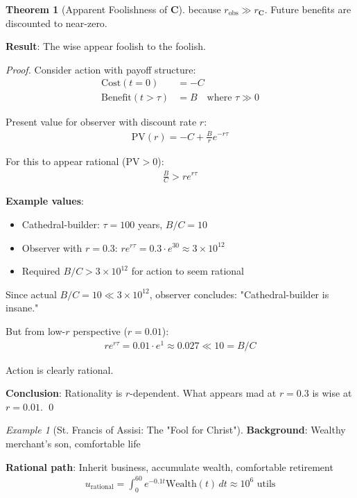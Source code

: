 \documentclass[11pt,a4paper]{article}
\theoremstyle{definition}
\newtheorem{theorem}{Theorem}[section]
\theoremstyle{remark}
\newtheorem{example}{Example}[section]
\begin{document}
\begin{enumerate}
\begin{theorem}[Apparent Foolishness of \(\mathbf{C}\)]
because \(r_{\text{obs}} \gg r_{\mathbf{C}}\). Future benefits are discounted to near-zero.

\textbf{Result}: The wise appear foolish to the foolish.
\end{theorem}

\begin{proof}
Consider action with payoff structure:
\begin{align}
\text{Cost}(t=0) &= -C \\
\text{Benefit}(t > \tau) &= B \quad \text{where } \tau \gg 0
\end{align}

Present value for observer with discount rate \(r\):
\begin{align}
\text{PV}(r) = -C + \frac{B}{r} e^{-r\tau}
\end{align}

For this to appear rational (\(\text{PV} > 0\)):
\begin{align}
\frac{B}{C} > r e^{r\tau}
\end{align}

\textbf{Example values}:
\begin{itemize}
    \item Cathedral-builder: \(\tau = 100\) years, \(B/C = 10\)
    \item Observer with \(r = 0.3\): \(r e^{r\tau} = 0.3 \cdot e^{30} \approx 3 \times 10^{12}\)
    \item Required \(B/C > 3 \times 10^{12}\) for action to seem rational
\end{itemize}

Since actual \(B/C = 10 \ll 3 \times 10^{12}\), observer concludes: "Cathedral-builder is insane."

But from low-\(r\) perspective (\(r = 0.01\)):
\begin{align}
r e^{r\tau} = 0.01 \cdot e^{1} \approx 0.027 \ll 10 = B/C
\end{align}

Action is clearly rational.

\textbf{Conclusion}: Rationality is \(r\)-dependent. What appears mad at \(r=0.3\) is wise at \(r=0.01\). \qed
\end{proof}

\begin{example}[St. Francis of Assisi: The "Fool for Christ"]
\textbf{Background}: Wealthy merchant's son, comfortable life

\textbf{Rational path}: Inherit business, accumulate wealth, comfortable retirement
\begin{align}
u_{\text{rational}} = \int_0^{60} e^{-0.1t} \text{Wealth}(t) \, dt \approx 10^6 \text{ utils}
\end{align}


\end{example}
\end{enumerate}
\end{document}
